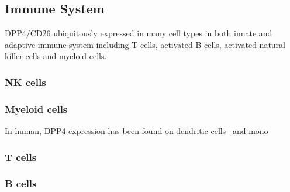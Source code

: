 \subsection{Immune System}
DPP4/CD26 ubiquitously expressed in many cell types in both innate and adaptive immune system including T cells, activated B cells, activated natural killer cells and myeloid cells.~\cite{Abbott1994,Shingu2003,Hong1989,Gutschmidt1981,Dikov2004,Bühling1995,Tanaka1992,Gorrell1991}  

\subsubsection{NK cells}

\subsubsection{Myeloid cells}
In human, DPP4 expression has been found on dendritic cells~\cite{Zhong2013,Gliddon2002,Epardaud2004} and mono

\subsubsection{T cells}
\subsubsection{B cells}

